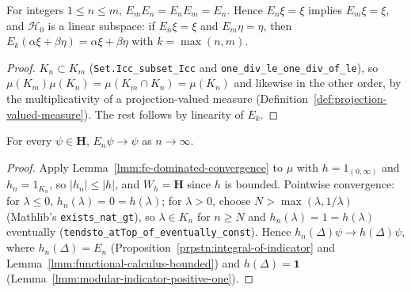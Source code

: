 \begin{lemma}
    \label{lmm:modular-spectral-projections-nested}
    \leanok
    For integers $1 \le n \le m$, $E_mE_n = E_nE_m = E_n$. Hence $E_n\xi = \xi$ implies $E_m\xi = \xi$, and $\mathcal{H}_0$ is a linear subspace: if $E_n\xi = \xi$ and $E_m\eta = \eta$, then $E_k(\alpha\xi + \beta\eta) = \alpha\xi + \beta\eta$ with $k = \max(n, m)$.
\end{lemma}
\begin{proof}
    \leanok
    $K_n \subset K_m$ (\texttt{Set.Icc\_subset\_Icc} and \texttt{one\_div\_le\_one\_div\_of\_le}), so $\mu(K_m)\mu(K_n) = \mu(K_m \cap K_n) = \mu(K_n)$ and likewise in the other order, by the multiplicativity of a projection-valued measure (Definition~\ref{def:projection-valued-measure}). The rest follows by linearity of $E_k$.
\end{proof}

\begin{lemma}
    \label{lmm:modular-spectral-projections-converge}
    \leanok
    For every $\psi \in \mathbf{H}$, $E_n\psi \to \psi$ as $n \to \infty$.
\end{lemma}
\begin{proof}
    \leanok
    Apply Lemma~\ref{lmm:fc-dominated-convergence} to $\mu$ with $h = 1_{(0, \infty)}$ and $h_n = 1_{K_n}$, so $|h_n| \le |h|$, and $W_h = \mathbf{H}$ since $h$ is bounded. Pointwise convergence: for $\lambda \le 0$, $h_n(\lambda) = 0 = h(\lambda)$; for $\lambda > 0$, choose $N > \max(\lambda, 1/\lambda)$ (Mathlib's \texttt{exists\_nat\_gt}), so $\lambda \in K_n$ for $n \ge N$ and $h_n(\lambda) = 1 = h(\lambda)$ eventually (\texttt{tendsto\_atTop\_of\_eventually\_const}). Hence $h_n(\Delta)\psi \to h(\Delta)\psi$, where $h_n(\Delta) = E_n$ (Proposition~\ref{prpstn:integral-of-indicator} and Lemma~\ref{lmm:functional-calculus-bounded}) and $h(\Delta) = \mathbf{1}$ (Lemma~\ref{lmm:modular-indicator-positive-one}).
\end{proof}

